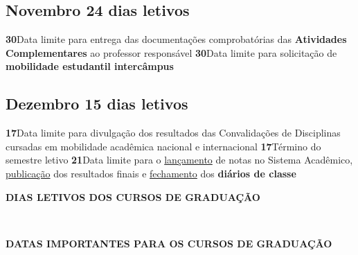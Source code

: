 \documentclass[thesis]{hmcposter}
\begin{document}
\begin{poster}
\subsection{Novembro \hfill 24 dias letivos}\textbf{30}\qquad Data limite para entrega das documentações comprobatórias das \textbf{Atividades Complementares} ao professor responsável \newline \null\textbf{30}\qquad Data limite para solicitação de \textbf{mobilidade estudantil intercâmpus} \newline \null\subsection{Dezembro \hfill 15 dias letivos}\textbf{17}\qquad Data limite para divulgação dos resultados das Convalidações de Disciplinas cursadas em mobilidade acadêmica nacional e internacional \newline \null\textbf{17}\qquad Término do semestre letivo \newline \null\textbf{21}\qquad Data limite para o \underline{lançamento} de notas no Sistema Acadêmico, \underline{publicação} dos resultados finais e \underline{fechamento} dos \textbf{diários de classe} \newline \null\newpage
~
\vfill
\begin{center}
\large \textbf{DIAS LETIVOS DOS CURSOS DE GRADUAÇÃO}
\newline
\null
\newline
\begin{table}
\centering
{}
\end{table}
\null
\end{center}
\vfill
\null
\columnbreak
~
\vfill
\begin{center}
\large \textbf{DATAS IMPORTANTES PARA OS CURSOS DE GRADUAÇÃO}
\newline
\null
\newline

\end{center}
\end{poster}
\end{document}
